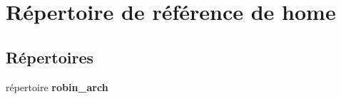 \section{Répertoire de référence de home}
\label{dir_75b82e7e4a5feb05200b9ad7adf06257}
\subsection*{Répertoires}
\begin{DoxyCompactItemize}
\item 
répertoire {\bf robin\-\_\-arch}
\end{DoxyCompactItemize}
